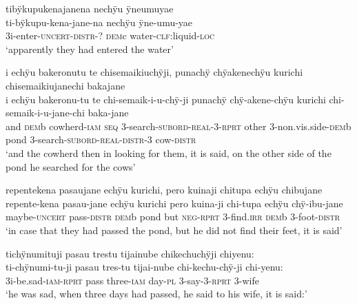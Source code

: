 \ea%
\begingl 
\glpreamble tibÿkupukenajanena nechÿu ÿneumuyae\\
\gla ti-bÿkupu-kena-jane-na nechÿu ÿne-umu-yae\\ 
\glb 3i-enter-\textsc{uncert}-\textsc{distr}-? \textsc{dem}c water-\textsc{clf:}liquid-\textsc{loc}\\ 
\glft ‘apparently they had entered the water’\\ 
\endgl
\xe

\ea%
\begingl 
\glpreamble i echÿu bakeronutu te chisemaikiuchÿji, punachÿ chÿakenechÿu kurichi \\chisemaikiujanechi bakajane\\
\gla i echÿu bakeronu-tu te chi-semaik-i-u-chÿ-ji punachÿ chÿ-akene-chÿu kurichi chi-semaik-i-u-jane-chi baka-jane\\ 
\glb and \textsc{dem}b cowherd-\textsc{iam} \textsc{seq} 3-search-\textsc{subord}-\textsc{real}-3-\textsc{rprt} other 3-non.vis.side-\textsc{dem}b pond 3-search-\textsc{subord}-\textsc{real}-\textsc{distr}-3 cow-\textsc{distr}\\ 
\glft ‘and the cowherd then in looking for them, it is said, on the other side of the pond he searched for the cows’\\ 
\endgl
\xe


\ea%
\begingl 
\glpreamble repentekena pasaujane echÿu kurichi, pero kuinaji chitupa echÿu chibujane\\
\gla repente-kena pasau-jane echÿu kurichi pero kuina-ji chi-tupa echÿu chÿ-ibu-jane\\ 
\glb maybe-\textsc{uncert} pass-\textsc{distr} \textsc{dem}b pond but \textsc{neg}-\textsc{rprt} 3-find.\textsc{irr} \textsc{dem}b 3-foot-\textsc{distr}\\ 
\glft ‘in case that they had passed the pond, but he did not find their feet, it is said’\\ 
\endgl
\xe

\ea%
\begingl 
\glpreamble tichÿnumituji pasau trestu tijainube chikechuchÿji chiyenu:\\
\gla ti-chÿnumi-tu-ji pasau tres-tu tijai-nube chi-kechu-chÿ-ji chi-yenu:\\ 
\glb 3i-be.sad-\textsc{iam}-\textsc{rprt} pass three-\textsc{iam} day-\textsc{pl} 3-say-3-\textsc{rprt} 3-wife\\ 
\glft ‘he was sad, when three days had passed, he said to his wife, it is said:’\\ 
\endgl
\xe


